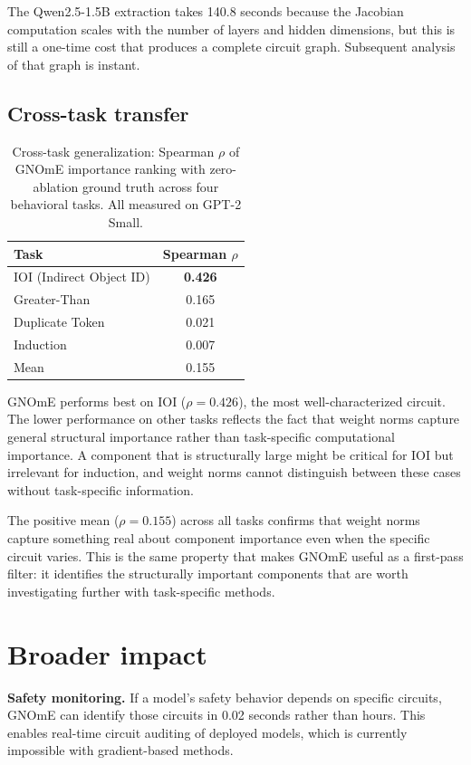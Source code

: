 \documentclass[11pt]{article}
\begin{document}
The Qwen2.5-1.5B extraction takes 140.8 seconds because the Jacobian computation scales with the number of layers and hidden dimensions, but this is still a one-time cost that produces a complete circuit graph. Subsequent analysis of that graph is instant.

\subsection{Cross-task transfer}

\begin{table}[t]
\centering
\caption{Cross-task generalization: Spearman $\rho$ of GNOmE importance ranking with zero-ablation ground truth across four behavioral tasks. All measured on GPT-2 Small.}
\label{tab:transfer}
\begin{tabular}{lc}
\toprule
\textbf{Task} & \textbf{Spearman $\rho$} \\
\midrule
IOI (Indirect Object ID) & \textbf{0.426} \\
Greater-Than & 0.165 \\
Duplicate Token & 0.021 \\
Induction & 0.007 \\
\midrule
Mean & 0.155 \\
\bottomrule
\end{tabular}
\end{table}

GNOmE performs best on IOI ($\rho = 0.426$), the most well-characterized circuit. The lower performance on other tasks reflects the fact that weight norms capture general structural importance rather than task-specific computational importance. A component that is structurally large might be critical for IOI but irrelevant for induction, and weight norms cannot distinguish between these cases without task-specific information.

The positive mean ($\rho = 0.155$) across all tasks confirms that weight norms capture something real about component importance even when the specific circuit varies. This is the same property that makes GNOmE useful as a first-pass filter: it identifies the structurally important components that are worth investigating further with task-specific methods.

\section{Broader impact}

\textbf{Safety monitoring.} If a model's safety behavior depends on specific circuits, GNOmE can identify those circuits in 0.02 seconds rather than hours. This enables real-time circuit auditing of deployed models, which is currently impossible with gradient-based methods.
\end{document}
